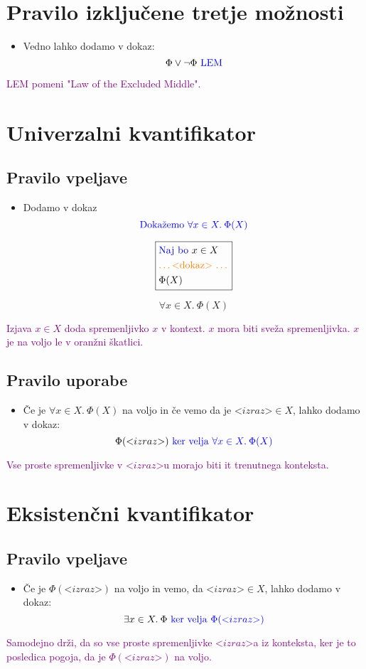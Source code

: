 \documentclass[12pt,a4paper]{article}
\newcommand{\blue}[1]{\textcolor{blue}{#1}}
\newcommand{\orange}[1]{\textcolor{orange}{#1}}
\newcommand{\purple}[1]{\textcolor{purple}{#1}}
\newcommand{\dokaz}{\orange{\text{\ldots <dokaz> \ldots}}}
\newcommand{\izraz}{\text{<} izraz \text{>}}
\newcommand{\skatlica}[1]{
    \begin{equation*}
        \boxed{
        \begin{aligned}
            #1
        \end{aligned}
        }
    \end{equation*}
}
\begin{document}
\section{Pravilo izključene tretje možnosti}
    \begin{itemize}
        \item Vedno lahko dodamo v dokaz:
        $$ \Phi \vee \neg \Phi \blue{\text{ LEM}}  $$
    \end{itemize}
    \purple{LEM pomeni "Law of the Excluded Middle".}

\section{Univerzalni kvantifikator}
    \subsection*{Pravilo vpeljave}
    \begin{itemize}
        \item Dodamo v dokaz
        $$ \blue{\text{Dokažemo } \forall x \in X. \: \Phi (X)  } $$
        \skatlica{
            &\blue{\text{Naj bo }} x \in X \\ 
            &\dokaz \\ 
            &\Phi (X)
        }
        $$ \forall x \in X. \: \Phi (X) $$
    \end{itemize}
    \purple{Izjava $ x \in X $ doda spremenljivko $x$ v kontext. $x$ mora biti sveža spremenljivka. $x$ je na voljo le v oranžni škatlici. }

    \subsection*{Pravilo uporabe}
    \begin{itemize}
        \item  Če je $ \forall x \in X. \: \Phi (X) $ na voljo in če vemo da je $ \izraz \in X $, lahko dodamo v dokaz:
        $$ \Phi ( \izraz ) \blue{\text{ ker velja } \forall x \in X. \: \Phi (X) } $$ 
    \end{itemize}
    \purple{Vse proste spremenljivke v $ \izraz $u morajo biti it trenutnega konteksta.}

\section{Eksistenčni kvantifikator}
    \subsection*{Pravilo vpeljave}
    \begin{itemize}
        \item Če je $ \Phi ( \izraz )$ na voljo in vemo, da $ \izraz \in X $, lahko dodamo v dokaz:
        $$ \exists x \in X . \: \Phi \blue{\text{ ker velja } \Phi ( \izraz ) } $$ 
    \end{itemize}
    \purple{Samodejno drži, da so vse proste spremenljivke $\izraz$a iz konteksta, ker je to posledica pogoja, da je $\Phi ( \izraz)$ na voljo.}
\end{document}
